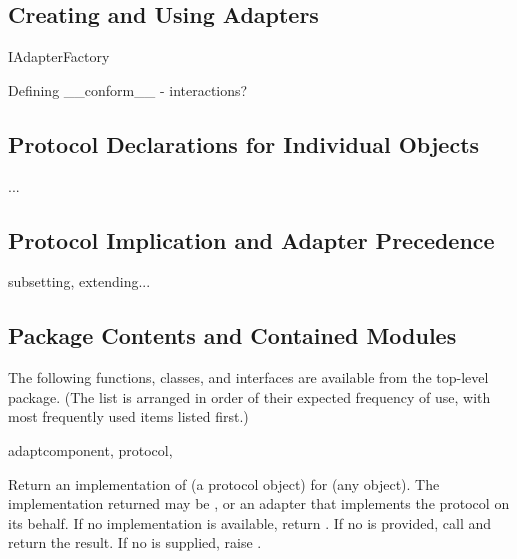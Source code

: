 \begin{verbatim%
}
\begin{verbatim%
}
\begin{verbatim%
}
\begin{verbatim%
}
\subsection{Creating and Using Adapters}

IAdapterFactory

Defining __conform__ - interactions?


\subsection{Protocol Declarations for Individual Objects \label{protocols-instances}}

...

\subsection{Protocol Implication and Adapter Precedence \label{proto-implication}}

subsetting, extending...



























\subsection{Package Contents and Contained Modules\label{protocols-contents}}

The following functions, classes, and interfaces are available from the
top-level  package.  (The list is arranged in order of
their expected frequency of use, with most frequently used items listed first.)

\begin{funcdesc}{adapt}{component, protocol,
}

Return an implementation of  (a protocol object) for
 (any object).  The implementation returned may be
, or an adapter that implements the protocol on its
behalf.  If no implementation is available, return .  If no
 is provided, call  and return the result.  If no  is supplied,
raise .


\end{funcdesc}
\end{verbatim%
}
\end{verbatim%
}
\end{verbatim%
}
\end{verbatim%
}

